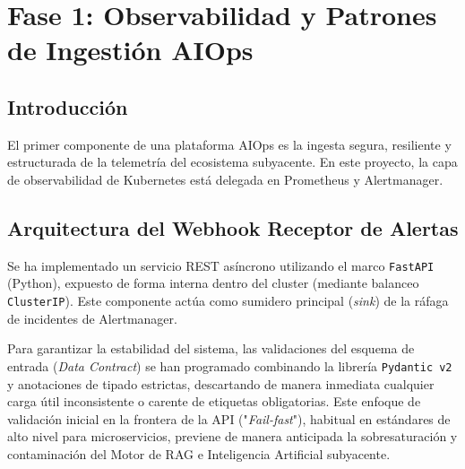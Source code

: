 \chapter{Fase 1: Observabilidad y Patrones de Ingestión AIOps}

\section{Introducción}
El primer componente de una plataforma AIOps es la ingesta segura, resiliente y estructurada de la telemetría del ecosistema subyacente. En este proyecto, la capa de observabilidad de Kubernetes está delegada en Prometheus y Alertmanager.

\section{Arquitectura del Webhook Receptor de Alertas}
Se ha implementado un servicio REST asíncrono utilizando el marco \texttt{FastAPI} (Python), expuesto de forma interna dentro del cluster (mediante balanceo \texttt{ClusterIP}). Este componente actúa como sumidero principal (\textit{sink}) de la ráfaga de incidentes de Alertmanager.

Para garantizar la estabilidad del sistema, las validaciones del esquema de entrada (\textit{Data Contract}) se han programado combinando la librería \texttt{Pydantic v2} y anotaciones de tipado estrictas, descartando de manera inmediata cualquier carga útil inconsistente o carente de etiquetas obligatorias. Este enfoque de validación inicial en la frontera de la API ("\textit{Fail-fast}"), habitual en estándares de alto nivel para microservicios, previene de manera anticipada la sobresaturación y contaminación del Motor de RAG e Inteligencia Artificial subyacente.
